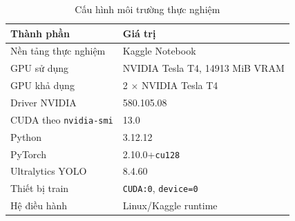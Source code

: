 \documentclass[12pt, a4paper]{article}
\begin{document}
\begin{table}[H]
  \centering
  \caption{Cấu hình môi trường thực nghiệm}
  \label{tab:env}
  \begin{tabular}{@{}ll@{}}
    \toprule
    \textbf{Thành phần} & \textbf{Giá trị} \\
    \midrule
    Nền tảng thực nghiệm & Kaggle Notebook \\
    GPU sử dụng & NVIDIA Tesla T4, 14913 MiB VRAM \\
    GPU khả dụng & 2 $\times$ NVIDIA Tesla T4 \\
    Driver NVIDIA & 580.105.08 \\
    CUDA theo \texttt{nvidia-smi} & 13.0 \\
    Python & 3.12.12 \\
    PyTorch & 2.10.0+\texttt{cu128} \\
    Ultralytics YOLO & 8.4.60 \\
    Thiết bị train & \texttt{CUDA:0}, \texttt{device=0} \\
    Hệ điều hành & Linux/Kaggle runtime \\
    \bottomrule
  \end{tabular}
\end{table}
\end{document}
